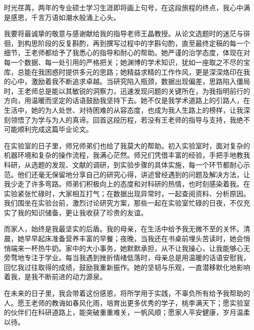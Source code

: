 \begin{acknowledge}%
时光荏苒，两年的专业硕士学习生涯即将画上句号，在这段旅程的终点，我心中满是感恩，千言万语如潮水般涌上心头。

我要将最诚挚的敬意与感谢献给我的指导老师王晶教授。从论文选题时的迷茫与徘徊，到构思阶段的反复斟酌，再到撰写过程中的字斟句酌，直至最终定稿的每一个细节，王老师都给予了我悉心的指导和耐心的帮助。她严谨的治学态度，体现在对每一个数据、每一处引用的严格把关；她渊博的学术知识，犹如一座取之不尽的宝库，总能在我困惑时提供多元的思路；她精益求精的工作作风，更是深深烙印在我的心中，激励着我不断追求卓越。当研究陷入瓶颈，数据出现偏差，思路陷入僵局时，王老师总是能以其敏锐的洞察力，迅速发现问题的关键所在，为我指明前行的方向，用温暖而坚定的话语鼓励我坚持下去。她不仅是我学术道路上的引路人，在生活中，她的为人处世、对待困难的从容态度，也成为我人生路上的榜样，让我深刻领悟了为学与为人的真谛。回首这段历程，若没有王老师的指导与支持，我绝不可能顺利完成这篇毕业论文。

在实验室的日子里，师兄师弟们也给了我莫大的帮助。初入实验室时，面对复杂的机器环境和复杂的操作流程，我满心茫然。师兄们凭借丰富的经验，手把手地教我科研，从选题的发现、文献的调研，到实验步骤的具体实施，每一个环节都耐心示范。他们还毫无保留地分享自己的研究心得，讲述曾经遇到的问题及解决方法，让我少走了许多弯路。师弟们积极向上的态度和对科研的热情，也时刻感染着我。在实验紧张忙碌时，大家相互打气；在数据出现异常时，一起查阅资料、分析原因。我们围坐在实验台前，激烈讨论研究方案，那些一起在实验室忙碌的日夜，不仅充实了我的知识储备，更让我收获了珍贵的友谊。

而家人，始终是我最坚实的后盾。我的母亲，在生活中给予我无微不至的关怀。清晨，她早早起床准备营养丰富的早餐；夜晚，当我还在书桌前埋头苦读时，她会悄悄端来一杯热牛奶。家中的大小事务，她默默承担，从不让我操心，让我能够心无旁骛地专注于学业。每当我遇到挫折情绪低落时，母亲总是用温暖的话语安慰我，回忆我过往取得的成绩，鼓励我重新振作。她的坚韧与乐观，一直潜移默化地影响着我，是我不断前进的动力源泉。

在未来的日子里，我会带着这份感恩，将所学用于实践，不辜负所有给予我帮助的人。愿王老师的教诲如春风化雨，培育出更多优秀的学子，桃李满天下；愿实验室的伙伴们在科研道路上，能突破重重难关，一帆风顺；愿家人平安健康，岁月温柔以待。
    
\end{acknowledge}